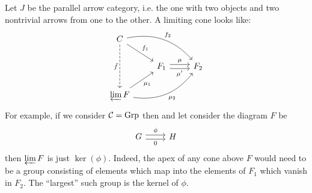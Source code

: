 \documentclass[12pt]{article}
\begin{document}
\begin{example}
	Let $J$ be the parallel arrow category, i.e. the one with two objects and two nontrivial arrows from one to the other. A limiting cone looks like:
	\begin{equation*}
\begin{tikzcd}
C \arrow[dd, "\tilde{f}"', dashed] \arrow[rd, "f_1"] \arrow[rrd, "f_2", bend left] &                                                                  &     \\
                                                                                   & F_1 \arrow[r, "\mu", shift left] \arrow[r, "\mu'"', shift right] & F_2 \\
\varprojlim F \arrow[ru, "\mu_1"'] \arrow[rru, "\mu_2"', bend right]               &                                                                  &    
\end{tikzcd}
	\end{equation*}
	For example, if we consider $\mathcal{C}=\text{Grp}$ then and let consider the diagram $F$ be
	\begin{equation*}
\begin{tikzcd}
G \arrow[r, "\phi", shift left] \arrow[r, "0"', shift right] & H
\end{tikzcd}
	\end{equation*}
	then $\varprojlim F$ is just $\ker(\phi)$. Indeed, the apex of any cone above $F$ would need to be a group consisting of elements which map into the elements of $F_1$ which vanish in $F_2$. The ``largest'' such group is the kernel of $\phi$. 
\end{example}
\end{document}
